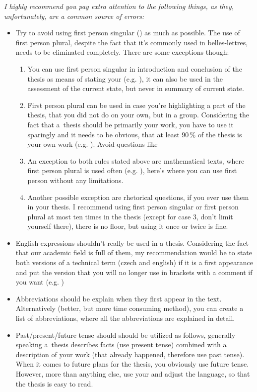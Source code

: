 \it I highly recommend you pay extra attention to the following things, as they, unfortunately, are a common source of errors:
\begin{itemize}
  \item{Try to avoid using first person singular () as much as possible. The use of first person plural, despite the fact that it's commonly used in belles-lettres, needs to be eliminated completely. There are some exceptions though:
    \begin{enumerate}
      \item{You can use first person singular in introduction and conclusion of the thesis as means of stating your  (e.g. ), it can also be used in the assessment of the current state, but never in summary of current state.}
      \item{First person plural can be used in case you're highlighting a part of the thesis, that you did not do on your own, but in a group. Considering the fact that a~thesis should be primarily your work, you have to use it sparingly and it needs to be obvious, that at least 90\,\% of the thesis is your own work (e.g. ). Avoid questions like }
      \item{An exception to both rules stated above are mathematical texts, where first person plural is used often (e.g. ), here's where you can use first person without any limitations.}
      \item{Another possible exception are rhetorical questions, if you ever use them in your thesis. I  recommend using first person singular or first person plural at most ten times in the thesis (except for case 3, don't limit yourself there), there is no floor, but using it once or twice is fine.}
    \end{enumerate}}
  \item{English expressions shouldn't really be used in a thesis. Considering the fact that our academic field is full of them, my recommendation would be to state both versions of a technical term (czech and english) if it is a first appearance and put the version that you will no longer use in brackets with a comment if you want (e.g. )}
  \item{Abbreviations should be explain when they first appear in the text. Alternatively (better, but more time consuming method), you can create a list of abbreviations, where all the abbreviations are explained in detail.}
  \item{Past/present/future tense should should be utilized as follows, generally speaking a~thesis describes facts (use present tense) combined with a description of your work (that already happened, therefore use past tense). When it comes to future plans for the thesis, you obviously use future tense. However, more than anything else, use your  and adjust the language, so that the thesis is easy to read.}
\end{itemize}
